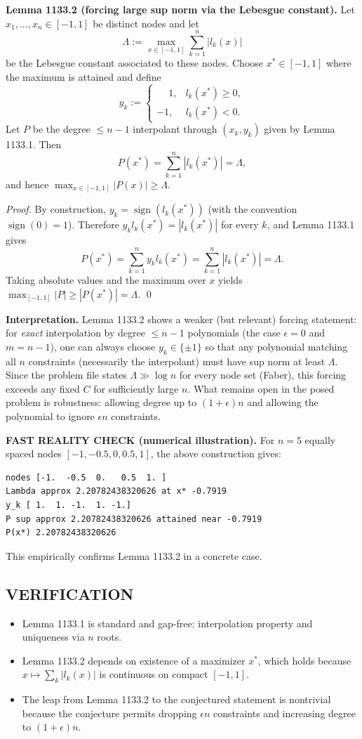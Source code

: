 \textbf{Lemma 1133.2 (forcing large sup norm via the Lebesgue constant).}
Let $x_1,\dots,x_n\in[-1,1]$ be distinct nodes and let
\[
\Lambda:=\max_{x\in[-1,1]}\sum_{k=1}^n |l_k(x)|
\]
be the Lebesgue constant associated to these nodes.
Choose $x^*\in[-1,1]$ where the maximum is attained and define
\[
 y_k:=\begin{cases}
 \phantom{-}1,& l_k(x^*)\ge 0,\\
 -1,& l_k(x^*)<0.
 \end{cases}
\]
Let $P$ be the degree $\le n-1$ interpolant through $(x_k,y_k)$ given by Lemma 1133.1.
Then
\[
P(x^*)=\sum_{k=1}^n |l_k(x^*)|=\Lambda,
\]
and hence $\max_{x\in[-1,1]}|P(x)|\ge \Lambda$.

\emph{Proof.}
By construction, $y_k=\operatorname{sign}(l_k(x^*))$ (with the convention $\operatorname{sign}(0)=1$).
Therefore $y_k l_k(x^*)=|l_k(x^*)|$ for every $k$, and Lemma 1133.1 gives
\[
P(x^*)=\sum_{k=1}^n y_k l_k(x^*)=\sum_{k=1}^n |l_k(x^*)|=\Lambda.
\]
Taking absolute values and the maximum over $x$ yields $\max_{[-1,1]}|P|\ge |P(x^*)|=\Lambda$.
\qed

\textbf{Interpretation.}
Lemma 1133.2 shows a weaker (but relevant) forcing statement: for \emph{exact} interpolation by degree $\le n-1$ polynomials (the case $\epsilon=0$ and $m=n-1$), one can always choose $y_k\in\{\pm 1\}$ so that any polynomial matching all $n$ constraints (necessarily the interpolant) must have sup norm at least $\Lambda$.
Since the problem file states $\Lambda\gg\log n$ for every node set (Faber), this forcing exceeds any fixed $C$ for sufficiently large $n$.
What remains open in the posed problem is robustness: allowing degree up to $(1+\epsilon)n$ and allowing the polynomial to ignore $\epsilon n$ constraints.

\textbf{FAST REALITY CHECK (numerical illustration).}
For $n=5$ equally spaced nodes $[-1,-0.5,0,0.5,1]$, the above construction gives:
\begin{verbatim}
nodes [-1.  -0.5  0.   0.5  1. ]
Lambda approx 2.20782438320626 at x* -0.7919
y_k [ 1.  1. -1.  1. -1.]
P sup approx 2.20782438320626 attained near -0.7919
P(x*) 2.20782438320626
\end{verbatim}
This empirically confirms Lemma 1133.2 in a concrete case.

\subsection*{VERIFICATION}
\begin{itemize}
\item Lemma 1133.1 is standard and gap-free: interpolation property and uniqueness via $n$ roots.
\item Lemma 1133.2 depends on existence of a maximizer $x^*$, which holds because $x\mapsto \sum_k|l_k(x)|$ is continuous on compact $[-1,1]$.
\item The leap from Lemma 1133.2 to the conjectured statement is nontrivial because the conjecture permits dropping $\epsilon n$ constraints and increasing degree to $(1+\epsilon)n$.
\end{itemize}

